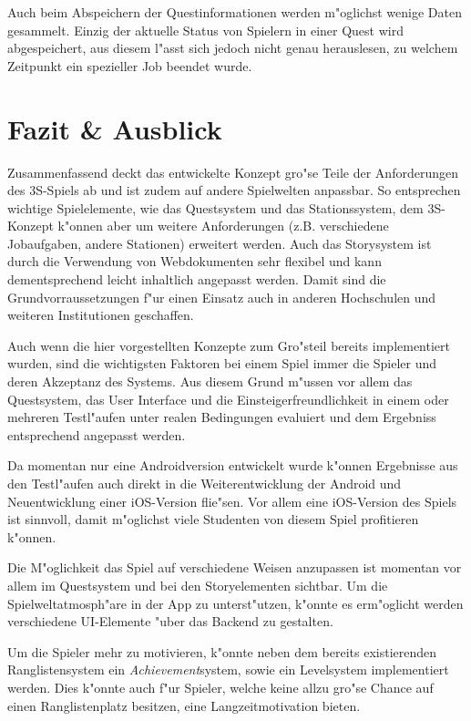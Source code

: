 \documentclass{article}
\begin{document}
Auch beim Abspeichern der Questinformationen werden m"oglichst wenige Daten gesammelt. Einzig der aktuelle Status von Spielern in einer Quest wird abgespeichert, aus diesem l"asst sich jedoch nicht genau herauslesen, zu welchem Zeitpunkt ein spezieller Job beendet wurde.
\section{Fazit \& Ausblick}
\label{sec:fazit}
Zusammenfassend deckt das entwickelte Konzept gro"se Teile der Anforderungen des 3S-Spiels ab und ist zudem auf andere Spielwelten anpassbar. So entsprechen wichtige Spielelemente, wie das Questsystem und das Stationssystem, dem 3S-Konzept k"onnen aber um weitere Anforderungen (z.B. verschiedene Jobaufgaben, andere Stationen) erweitert werden. Auch das Storysystem ist durch die Verwendung von Webdokumenten sehr flexibel und kann dementsprechend leicht inhaltlich angepasst werden. Damit sind die Grundvorraussetzungen f"ur einen Einsatz auch in anderen Hochschulen und weiteren Institutionen geschaffen.

Auch wenn die hier vorgestellten Konzepte zum Gro"steil bereits implementiert wurden, sind die wichtigsten Faktoren bei einem Spiel immer die Spieler und deren Akzeptanz des Systems. Aus diesem Grund m"ussen vor allem das Questsystem, das User Interface und die Einsteigerfreundlichkeit in einem oder mehreren Testl"aufen unter realen Bedingungen evaluiert und dem Ergebniss entsprechend angepasst werden.

Da momentan nur eine Androidversion entwickelt wurde k"onnen Ergebnisse aus den Testl"aufen auch direkt in die Weiterentwicklung der Android und Neuentwicklung einer iOS-Version flie"sen. Vor allem eine iOS-Version des Spiels ist sinnvoll, damit m"oglichst viele Studenten von diesem Spiel profitieren k"onnen.

Die M"oglichkeit das Spiel auf verschiedene Weisen anzupassen ist momentan vor allem im Questsystem und bei den Storyelementen sichtbar. Um die Spielweltatmosph"are in der App zu unterst"utzen, k"onnte es erm"oglicht werden verschiedene UI-Elemente "uber das Backend zu gestalten.

Um die Spieler mehr zu motivieren, k"onnte neben dem bereits existierenden Ranglistensystem ein \textit{Achievement}system, sowie ein Levelsystem implementiert werden. Dies k"onnte auch f"ur Spieler, welche keine allzu gro"se Chance auf einen Ranglistenplatz besitzen, eine Langzeitmotivation bieten.
\end{document}
